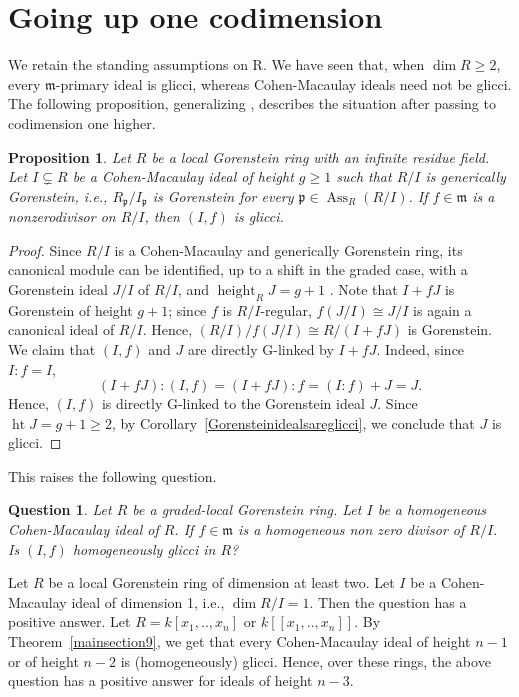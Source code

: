 \documentclass[11pt,letterpaper]{amsart}
\DeclareMathOperator{\Ass}{Ass}
\DeclareMathOperator{\height}{height}
\theoremstyle{plain}
\newtheorem{prop}[thm]{Proposition}
\newtheorem{question}[thm]{Question}
\theoremstyle{definition}
\theoremstyle{remark}
\begin{document}
\section{Going up one codimension} We retain the standing assumptions on R. We have seen that, when $\dim R\geq 2$, every $\mathfrak m$-primary ideal is glicci, whereas Cohen-Macaulay ideals need not be glicci. The following proposition, generalizing \cite[Lemma 2.1]{migliore2013glicci}, describes the situation after passing to codimension one higher.
\begin{prop}\label{oneheightup}
Let $R$ be a local Gorenstein
ring with an infinite residue field. Let $I\subsetneq R$ be a 
Cohen-Macaulay ideal of height $g\geq 1$ such that $R/I$ is generically
Gorenstein, i.e., $R_{\mathfrak p}/I_{\mathfrak p}$ is Gorenstein for every
$\mathfrak p\in\Ass_R(R/I)$. If $f\in\mathfrak m$ is a  nonzerodivisor on $R/I$, then
$(I,f)$ is glicci.
\end{prop}

\begin{proof}
Since $R/I$ is a Cohen-Macaulay and generically Gorenstein ring, its
canonical module can be identified, up to a shift in the graded case, with a Gorenstein ideal $J/I$ of $R/I$, and $\height_R J=g+1$ \cite[Proposition~3.3.18]{bruns1998cohen}. Note that $I+fJ$ is Gorenstein of height
$g+1$; since $f$ is
$R/I$-regular, $f(J/I)\cong J/I$ is again a canonical ideal of $R/I$.
Hence, $(R/I)/f(J/I)\cong R/(I+fJ)$ is Gorenstein. We claim that $(I,f)$ and $J$ are directly G-linked by $I+fJ$.
Indeed, since $I:f=I$,
\[
(I+fJ):(I,f)=(I+fJ):f=(I:f)+J=J.
\]
Hence, $(I,f)$ is directly G-linked to the Gorenstein ideal $J$. Since
$\operatorname{ht}J=g+1\geq2$, by Corollary~\ref{Gorensteinidealsareglicci}, we conclude that $J$ is glicci.
\end{proof}

This raises the following question. 

\begin{question}\label{questiononeheightup}
    Let $R$ be a graded-local Gorenstein ring. Let $I$ be a homogeneous Cohen-Macaulay ideal of $R$. If $f\in\mathfrak m$ is a homogeneous non zero divisor of $R/I$. Is $(I,f)$ homogeneously glicci in $R$?
\end{question}

Let $R$ be a local Gorenstein ring of dimension at least two. Let $I$ be a Cohen-Macaulay ideal of dimension 1, i.e., $\dim R/I=1$. Then the question has a positive answer. Let $R=k[x_1,..,x_n]$ or $k[[x_1,..,x_n]]$. By Theorem~\ref{mainsection9}, we get that every Cohen-Macaulay ideal of height $n-1$ or of height $n-2$ is (homogeneously) glicci. Hence, over these rings, the above question has a positive answer for ideals of height $n-3$.
\end{document}
